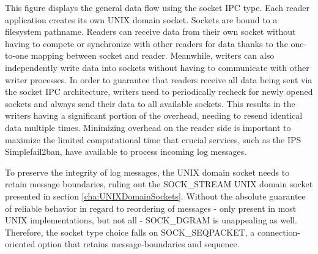 This figure displays the general data flow using the socket \ac{IPC} type.
Each reader application creates its own UNIX domain socket.
Sockets are bound to a filesystem pathname.
Readers can receive data from their own socket without having to compete or synchronize with other readers for data thanks to the one-to-one mapping between socket and reader.
Meanwhile, writers can also independently write data into sockets without having to communicate with other writer processes.
In order to guarantee that readers receive all data being sent via the socket \ac{IPC} architecture, writers need to periodically recheck for newly opened sockets and always send their data to all available sockets.
This results in the writers having a significant portion of the overhead, needing to resend identical data multiple times.
Minimizing overhead on the reader side is important to maximize the limited computational time that crucial services, such as the \ac{IPS} Simplefail2ban, have available to process incoming log messages.

To preserve the integrity of log messages, the UNIX domain socket needs to retain message boundaries, ruling out the SOCK\_STREAM UNIX domain socket presented in section \ref{cha:UNIXDomainSockets}.
Without the absolute guarantee of reliable behavior in regard to reordering of messages - only present in most UNIX implementations, but not all\cite{man:unixsockets} - SOCK\_DGRAM is unappealing as well.
Therefore, the socket type choice falls on SOCK\_SEQPACKET, a connection-oriented option that retains message-boundaries and sequence.